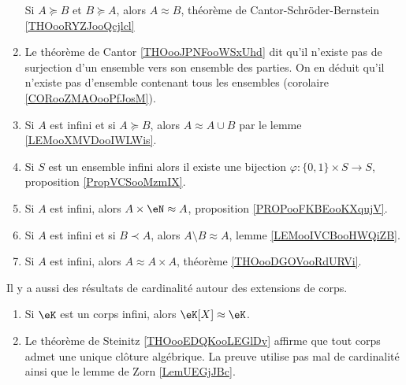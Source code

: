 \begin{enumerate}
	      Si \( A\succeq B\) et \( B\succeq A\), alors \( A\approx B\), théorème de Cantor-Schröder-Bernstein \ref{THOooRYZJooQcjlcl}
	\item
	      Le théorème de Cantor \ref{THOooJPNFooWSxUhd} dit qu'il n'existe pas de surjection d'un ensemble vers son ensemble des parties. On en déduit qu'il n'existe pas d'ensemble contenant tous les ensembles (corolaire \ref{CORooZMAOooPfJosM}).
	\item
	      Si \( A\) est infini et si \( A\succeq B\), alors \( A\approx A\cup B\) par le lemme \ref{LEMooXMVDooIWLWis}.
	\item
	      Si \( S\) est un ensemble infini alors il existe une bijection \( \varphi\colon \{ 0,1 \}\times S\to S\), proposition \ref{PropVCSooMzmIX}.
	\item
	      Si \( A\) est infini, alors \( A\times \eN\approx A\), proposition \ref{PROPooFKBEooKXqujV}.
	\item
	      Si \( A\) est infini et si \( B\prec A\), alors \( A\setminus B\approx A\), lemme \ref{LEMooIVCBooHWQiZB}.
	\item
	      Si \( A\) est infini, alors \( A\approx A\times A\), théorème \ref{THOooDGOVooRdURVi}.
\end{enumerate}

Il y a aussi des résultats de cardinalité autour des extensions de corps.
\begin{enumerate}
	\item
	      Si \( \eK\) est un corps infini, alors \( \eK[X]\approx \eK\).
	\item
	      Le théorème de Steinitz \ref{THOooEDQKooLEGlDv} affirme que tout corps admet une unique clôture algébrique. La preuve utilise pas mal de cardinalité ainsi que le lemme de Zorn \ref{LemUEGjJBc}.
\end{enumerate}
